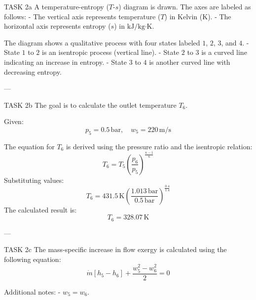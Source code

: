 TASK 2a  
A temperature-entropy (\( T \)-\( s \)) diagram is drawn. The axes are labeled as follows:  
- The vertical axis represents temperature (\( T \)) in Kelvin (\( \text{K} \)).  
- The horizontal axis represents entropy (\( s \)) in \( \text{kJ}/\text{kg·K} \).  

The diagram shows a qualitative process with four states labeled \( 1 \), \( 2 \), \( 3 \), and \( 4 \).  
- State \( 1 \) to \( 2 \) is an isentropic process (vertical line).  
- State \( 2 \) to \( 3 \) is a curved line indicating an increase in entropy.  
- State \( 3 \) to \( 4 \) is another curved line with decreasing entropy.  

---

TASK 2b  
The goal is to calculate the outlet temperature \( T_6 \).  

Given:  
\[
p_5 = 0.5 \, \text{bar}, \quad w_5 = 220 \, \text{m/s}
\]  

The equation for \( T_6 \) is derived using the pressure ratio and the isentropic relation:  
\[
T_6 = T_5 \left( \frac{p_6}{p_5} \right)^{\frac{\kappa - 1}{\kappa}}
\]  
Substituting values:  
\[
T_6 = 431.5 \, \text{K} \left( \frac{1.013 \, \text{bar}}{0.5 \, \text{bar}} \right)^{\frac{0.4}{1.4}}
\]  
The calculated result is:  
\[
T_6 = 328.07 \, \text{K}
\]  

---

TASK 2c  
The mass-specific increase in flow exergy is calculated using the following equation:  
\[
\dot{m} \left[ h_5 - h_6 \right] + \frac{w_5^2 - w_6^2}{2} = 0
\]  

Additional notes:  
- \( w_5 = w_6 \).  
